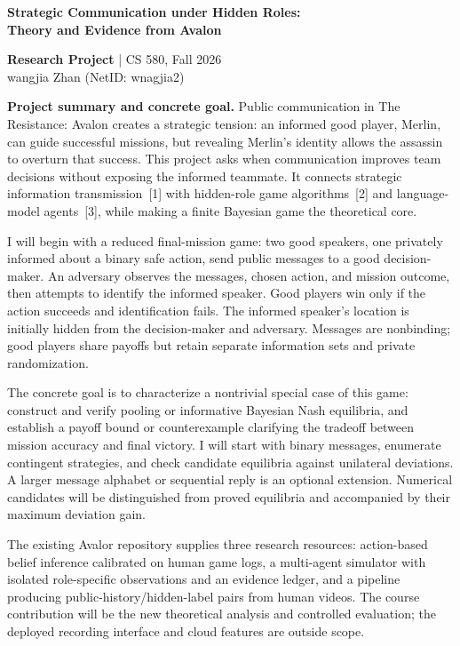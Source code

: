 \documentclass[11pt,letterpaper]{article}
\begin{document}
\begin{center}
{\large\bfseries Strategic Communication under Hidden Roles:\\
Theory and Evidence from Avalon}\par
\vspace{3pt}
\textbf{Research Project} \quad | \quad CS 580, Fall 2026\\
wangjia Zhan \quad (NetID: wnagjia2)
\end{center}
\vspace{-8pt}

\textbf{Project summary and concrete goal.}
Public communication in The Resistance: Avalon creates a strategic tension: an informed good player, Merlin, can guide successful missions, but revealing Merlin's identity allows the assassin to overturn that success. This project asks when communication improves team decisions without exposing the informed teammate. It connects strategic information transmission~[1] with hidden-role game algorithms~[2] and language-model agents~[3], while making a finite Bayesian game the theoretical core.

I will begin with a reduced final-mission game: two good speakers, one privately informed about a binary safe action, send public messages to a good decision-maker. An adversary observes the messages, chosen action, and mission outcome, then attempts to identify the informed speaker. Good players win only if the action succeeds and identification fails. The informed speaker's location is initially hidden from the decision-maker and adversary. Messages are nonbinding; good players share payoffs but retain separate information sets and private randomization.

The concrete goal is to characterize a nontrivial special case of this game: construct and verify pooling or informative Bayesian Nash equilibria, and establish a payoff bound or counterexample clarifying the tradeoff between mission accuracy and final victory. I will start with binary messages, enumerate contingent strategies, and check candidate equilibria against unilateral deviations. A larger message alphabet or sequential reply is an optional extension. Numerical candidates will be distinguished from proved equilibria and accompanied by their maximum deviation gain.

The existing Avalor repository supplies three research resources: action-based belief inference calibrated on human game logs, a multi-agent simulator with isolated role-specific observations and an evidence ledger, and a pipeline producing public-history/hidden-label pairs from human videos. The course contribution will be the new theoretical analysis and controlled evaluation; the deployed recording interface and cloud features are outside scope.
\end{document}
